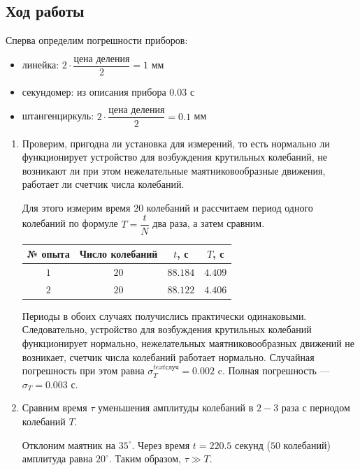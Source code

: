 \documentclass[a4paper,12pt]{article}
\begin{document}
\subsection*{Ход работы}
Сперва определим погрешности приборов:
\begin{itemize}
	\item линейка: $2\cdot\dfrac{\text{цена деления}}{2} = 1$ мм
	\item секундомер: из описания прибора $0.03$ с
	\item штангенциркуль: $2\cdot\dfrac{\text{цена деления}}{2} = 0.1$ мм
\end{itemize}
\begin{enumerate}
	\item 
	Проверим, пригодна ли установка для измерений, то есть нормально ли функционирует устройство для возбуждения крутильных колебаний, не возникают ли при этом нежелательные маятниковообразные движения, работает ли счетчик числа колебаний.

	Для этого измерим время $20$ колебаний и рассчитаем период одного колебаний по формуле $T = \dfrac{t}{N}$ два раза, а затем сравним. 
	\begin{table}[h]
		\centering
		\begin{tabular}{|c|c|c|c|} \hline 
			№ опыта & Число колебаний & $t$, с 	 & $T$, с  \\ \hline 
			$1$ 	& $20$ 			  & $88.184$ & $4.409$ \\ \hline 
			$2$ 	& $20$ 			  & $88.122$ & $4.406$ \\ \hline 
		\end{tabular} 
	\end{table}

	Периоды в обоих случаях получислись практически одинаковыми. Следовательно, устройство для возбуждения крутильных колебаний функционирует нормально, нежелательных маятниковообразных движений не возникает, счетчик числа колебаний работает нормально.
	Случайная погрешность при этом равна $\sigma_T^{text{случ}} = 0.002$ c. Полная погрешность --- $\sigma_T = 0.003$ с.

	\item

	Сравним время $\tau$ уменьшения амплитуды колебаний в $2-3$ раза с периодом колебаний $T$.

	Отклоним маятник на $35^{\circ}$. Через время $t = 220.5$ секунд ($50$ колебаний) амплитуда равна $20^{\circ}$. Таким образом, $\tau \gg T$.
	

\end{enumerate}
\end{document}
